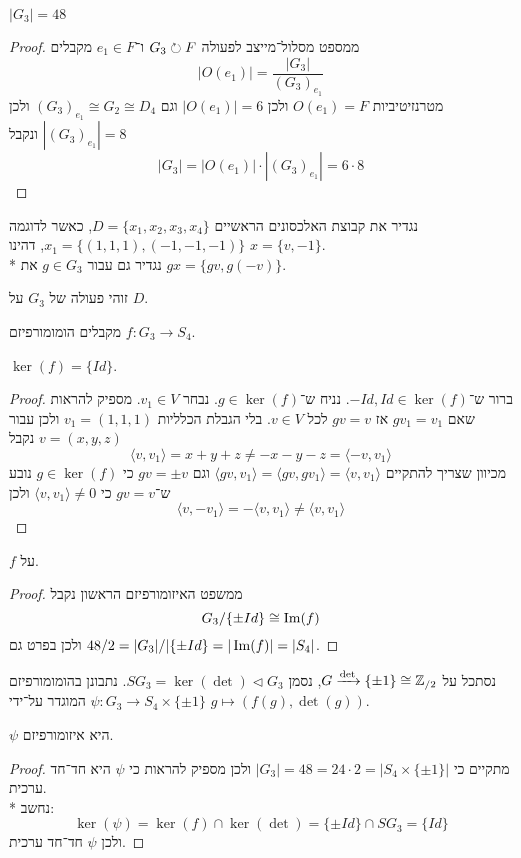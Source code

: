 \begin{conclusion}
	$|G_3| = 48$
\end{conclusion}
\begin{proof}
	ממספט מסלול־מייצב לפעולה $G_3 \circlearrowright F$ ו־$e_1 \in F$ מקבלים
	\[
		|O(e_1)| = \frac{|G_3|}{{(G_3)}_{e_1}}
	\]
	מטרנזיטיביות $O(e_1) = F$ ולכן $|O(e_1)| = 6$ וגם ${(G_3)}_{e_1} \cong G_2 \cong D_4$ ולכן $|{(G_3)}_{e_1}| = 8$ ונקבל
	\[
		|G_3| = |O(e_1)| \cdot |{(G_3)}_{e_1}| = 6 \cdot 8
	\]
\end{proof}
נגדיר את קבוצת האלכסונים הראשיים $D = \{x_1, x_2, x_3, x_4\}$, כאשר לדוגמה $x_1 = \{ (1, 1, 1), (-1, -1, -1) \}$, דהינו $x = \{v, -1\}$. \\*
נגדיר גם עבור $g \in G_3$ את $gx = \{ gv, g(-v)\}$.
\begin{proposition}
	זוהי פעולה של $G_3$ על $D$.
\end{proposition}
מקבלים הומומורפיזם $f : G_3 \to S_4$.
\begin{lemma}
	$\ker(f) = \{ Id \}$.
\end{lemma}
\begin{proof}
	ברור ש־$-Id, Id \in \ker(f)$.
	נניח ש־$g \in \ker(f)$.
	נבחר $v_1 \in V$.
	מספיק להראות שאם $g v_1 = v_1$ אז $gv = v$ לכל $v \in V$.
	בלי הגבלת הכלליות $v_1 = (1, 1, 1)$ ולכן עבור $v = (x, y, z)$ נקבל
	\[
		\langle v, v_1 \rangle = x + y + z \ne -x - y - z = \langle -v, v_1 \rangle
	\]
	מכיוון שצריך להתקיים $\langle gv, v_1 \rangle = \langle gv, gv_1 \rangle = \langle v, v_1 \rangle$
	וגם $gv = \pm v$ כי $g \in \ker(f)$ נובע ש־$gv = v$ כי $\langle v, v_1 \rangle \ne 0$ ולכן
	\[
		\langle v, -v_1 \rangle = - \langle v, v_1 \rangle \ne \langle v, v_1 \rangle
	\]
\end{proof}
\begin{conclusion}
	$f$ על.
\end{conclusion}
\begin{proof}
	ממשפט האיזומורפיזם הראשון נקבל
	\[
		G_3 / \{\pm Id\} \cong \operatorname{Im}(f)
	\]
	ולכן בפרט גם $48 / 2 = |G_3| / |\{ \pm Id \} = |\operatorname{Im}(f)| = |S_4|$.
\end{proof}
נסתכל על $G \xrightarrow{\det} \{ \pm 1 \} \cong \mathbb{Z}_{/2}$, נסמן $SG_3 = \ker(\det) \triangleleft G_3$.
נתבונן בהומומורפיזם $\psi : G_3 \to S_4 \times \{\pm 1\}$ המוגדר על־ידי $g \mapsto (f(g), \det(g))$.
\begin{proposition}
	$\psi$ היא איזומורפיזם.
\end{proposition}
\begin{proof}
	מתקיים כי $|G_3| = 48 = 24 \cdot 2 = |S_4 \times \{\pm 1\}|$ ולכן מספיק להראות כי $\psi$ היא חד־חד ערכית. \\*
	נחשב:
	\[
		\ker(\psi) = \ker(f) \cap \ker(\det) = \{ \pm Id \} \cap SG_3 = \{ Id \}
	\]
	ולכן $\psi$ חד־חד ערכית.
\end{proof}

